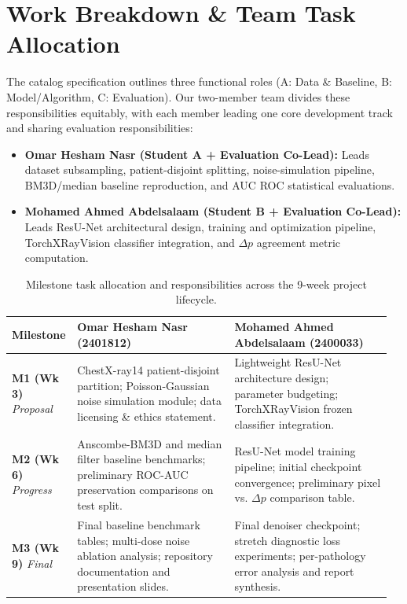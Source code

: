 \documentclass[11pt]{article}
\begin{document}
\section{Work Breakdown \& Team Task Allocation}
\label{sec:workbreakdown}
The catalog specification outlines three functional roles (A: Data \& Baseline, B: Model/Algorithm, C: Evaluation). Our two-member team divides these responsibilities equitably, with each member leading one core development track and sharing evaluation responsibilities:
\begin{itemize}[leftmargin=*,noitemsep]
  \item \textbf{Omar Hesham Nasr (Student A + Evaluation Co-Lead):} Leads dataset subsampling, patient-disjoint splitting, noise-simulation pipeline, BM3D/median baseline reproduction, and AUC ROC statistical evaluations.
  \item \textbf{Mohamed Ahmed Abdelsalaam (Student B + Evaluation Co-Lead):} Leads ResU-Net architectural design, training and optimization pipeline, TorchXRayVision classifier integration, and $\Delta p$ agreement metric computation.
\end{itemize}

\begin{table}[h]
\centering
\caption{Milestone task allocation and responsibilities across the 9-week project lifecycle.}
\label{tab:tasks}
\begin{tabular}{@{}p{0.14\linewidth}p{0.41\linewidth}p{0.41\linewidth}@{}}
\toprule
\textbf{Milestone} & \textbf{Omar Hesham Nasr (2401812)} & \textbf{Mohamed Ahmed Abdelsalaam (2400033)} \\
\midrule
\textbf{M1 (Wk 3)} \newline \emph{Proposal} & 
ChestX-ray14 patient-disjoint partition; Poisson-Gaussian noise simulation module; data licensing \& ethics statement. & 
Lightweight ResU-Net architecture design; parameter budgeting; TorchXRayVision frozen classifier integration. \\
\midrule
\textbf{M2 (Wk 6)} \newline \emph{Progress} & 
Anscombe-BM3D and median filter baseline benchmarks; preliminary ROC-AUC preservation comparisons on test split. & 
ResU-Net model training pipeline; initial checkpoint convergence; preliminary pixel vs. $\Delta p$ comparison table. \\
\midrule
\textbf{M3 (Wk 9)} \newline \emph{Final} & 
Final baseline benchmark tables; multi-dose noise ablation analysis; repository documentation and presentation slides. & 
Final denoiser checkpoint; stretch diagnostic loss experiments; per-pathology error analysis and report synthesis. \\
\bottomrule
\end{tabular}
\end{table}



\end{document}

